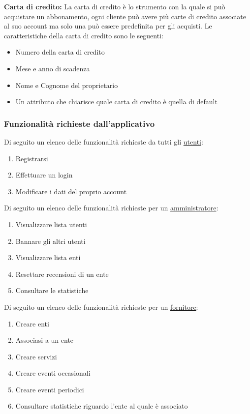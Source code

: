 \textbf{Carta di credito:} La carta di credito è lo strumento con la quale si può acquistare un abbonamento, ogni cliente può avere più carte di credito associate al suo account ma solo una può essere predefinita per gli acquisti.
Le caratteristiche della carta di credito sono le seguenti:
\begin{itemize}
    \item Numero della carta di credito
    \item Mese e anno di scadenza
    \item Nome e Cognome del proprietario
    \item Un attributo che chiarisce quale carta di credito è quella di default
\end{itemize}




\vspace{0.5cm}
\subsubsection{Funzionalità richieste dall'applicativo}


Di seguito un elenco delle funzionalità richieste da tutti gli \ul{utenti}:
\begin{enumerate}[label=u\arabic*)]
    \item Registrarsi
    \item Effettuare un login
    \item Modificare i dati del proprio account
\end{enumerate}

\vspace{0.5cm}


Di seguito un elenco delle funzionalità richieste per un \ul{amministratore}:
\begin{enumerate}[label=a\arabic*)]
    \item Visualizzare lista utenti
    \item Bannare gli altri utenti
    \item Visualizzare lista enti
    \item Resettare recensioni di un ente
    \item Consultare le statistiche
\end{enumerate}

\vspace{0.5cm}

Di seguito un elenco delle funzionalità richieste per un \ul{fornitore}: 
\begin{enumerate}[label=b\arabic*)]
    \item Creare enti
    \item Associasi a un ente
    \item Creare servizi
    \item Creare eventi occasionali
    \item Creare eventi periodici
    \item Consultare statistiche riguardo l'ente al quale è associato 
\end{enumerate}


